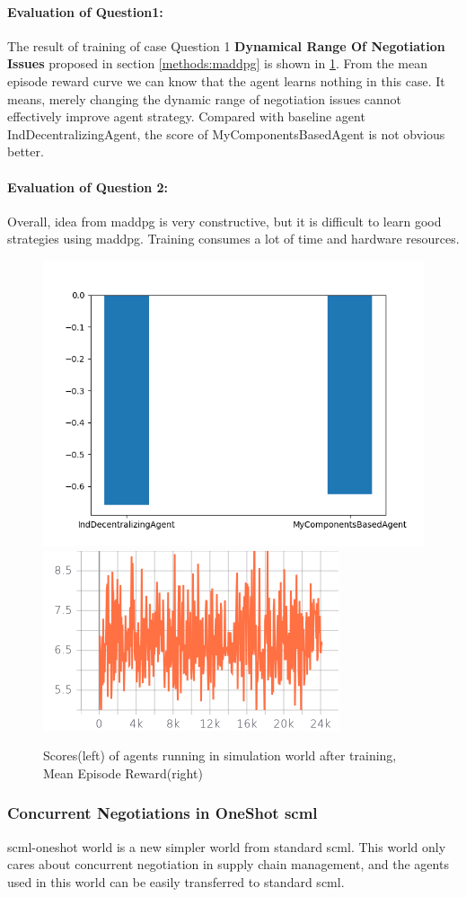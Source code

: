 \paragraph{Evaluation of Question1:} The result of training of case Question 1 \textbf{Dynamical Range Of Negotiation Issues} proposed in section \ref{methods:maddpg} is shown in \ref{fig:dynamical-range-issues-maddpg}. From the mean episode reward curve we can know that the agent learns nothing in this case. It means, merely changing the dynamic range of negotiation issues cannot effectively improve agent strategy. Compared with baseline agent IndDecentralizingAgent, the score of MyComponentsBasedAgent is not obvious better.  

\paragraph{Evaluation of Question 2:}  
 
Overall, idea from maddpg is very constructive, but it is difficult to learn good strategies using maddpg. Training consumes a lot of time and hardware resources.


\begin{figure}
    \includegraphics[width=.45\textwidth]{./images/dynamic_range_issues_maddpg.png}\hfill
    \includegraphics[width=.49\textwidth]{./images/dynamical_mean_episode_reward.png}
    \caption{Scores(left) of agents running in simulation world after training, Mean Episode Reward(right)}
		\label{fig:dynamical-range-issues-maddpg}
\end{figure}

\subsubsection{Concurrent Negotiations in OneShot \gls{scml}}
\gls{scml-oneshot} world is a new simpler world from standard scml. This world only cares about concurrent negotiation in supply chain management, and the agents used in this world can be easily transferred to standard scml. 
 
